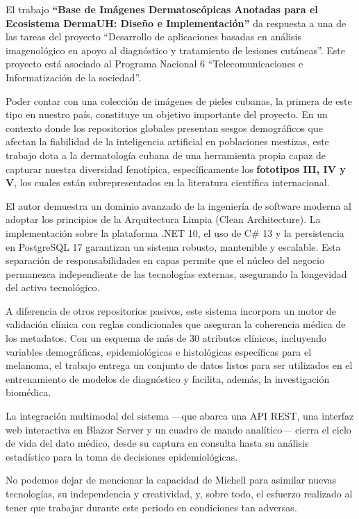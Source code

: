 \begin{opinion}

El trabajo \textbf{``Base de Imágenes Dermatoscópicas Anotadas para el Ecosistema DermaUH: Diseño e
Implementación''} da respuesta a una de las tareas del proyecto ``Desarrollo de aplicaciones basadas
en análisis imagenológico en apoyo al diagnóstico y tratamiento de lesiones cutáneas''. Este proyecto
está asociado al Programa Nacional 6 ``Telecomunicaciones e Informatización de la sociedad''.

Poder contar con una colección de imágenes de pieles cubanas, la primera de este tipo en nuestro país,
constituye un objetivo importante del proyecto. En un contexto donde los repositorios globales
presentan sesgos demográficos que afectan la fiabilidad de la inteligencia artificial en poblaciones
mestizas, este trabajo dota a la dermatología cubana de una herramienta propia capaz de capturar
nuestra diversidad fenotípica, específicamente los \textbf{fototipos III, IV y V}, los cuales están
subrepresentados en la literatura científica internacional.

El autor demuestra un dominio avanzado de la ingeniería de software moderna al adoptar los
principios de la Arquitectura Limpia (Clean Architecture). La implementación sobre la plataforma .NET
10, el uso de C\# 13 y la persistencia en PostgreSQL 17 garantizan un sistema robusto, mantenible y
escalable. Esta separación de responsabilidades en capas permite que el núcleo del negocio
permanezca independiente de las tecnologías externas, asegurando la longevidad del activo
tecnológico.

A diferencia de otros repositorios pasivos, este sistema incorpora un motor de validación clínica con
reglas condicionales que aseguran la coherencia médica de los metadatos. Con un esquema de más de
30 atributos clínicos, incluyendo variables demográficas, epidemiológicas e histológicas específicas
para el melanoma, el trabajo entrega un conjunto de datos listos para ser utilizados en el
entrenamiento de modelos de diagnóstico y facilita, además, la investigación biomédica.

La integración multimodal del sistema ---que abarca una API REST, una interfaz web interactiva en
Blazor Server y un cuadro de mando analítico--- cierra el ciclo de vida del dato médico, desde su captura
en consulta hasta su análisis estadístico para la toma de decisiones epidemiológicas.

No podemos dejar de mencionar la capacidad de Michell para asimilar nuevas tecnologías, su
independencia y creatividad, y, sobre todo, el esfuerzo realizado al tener que trabajar durante este
periodo en condiciones tan adversas.


\end{opinion}
